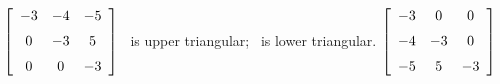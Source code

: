 {$\left[ \begin {array}{ccc} -3&-4&-5\\\noalign{\medskip}0&-3&5
\\\noalign{\medskip}0&0&-3\end {array} \right] $} 
{\tta\ is upper triangular; \ttat\ is lower triangular. $\left[ \begin {array}{ccc} -3&0&0\\\noalign{\medskip}-4&-3&0
\\\noalign{\medskip}-5&5&-3\end {array} \right]$}
 

 


